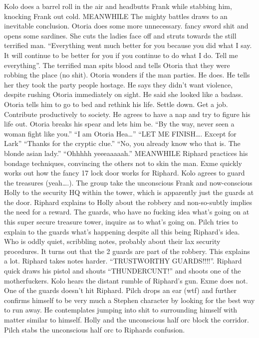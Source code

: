 Kolo does a barrel roll in the air and headbutts Frank while stabbing him, knocking Frank out cold.\medskip
MEANWHILE\medskip
The mighty battles draws to an inevitable conclusion. Otoria does some more unnecessary. fancy sword shit and opens some sardines. She cuts the ladies face off and struts towards the still terrified man.\medskip
“Everything went much better for you because you did what I say. It will continue to be better for you if you continue to do what I do. Tell me everything”.\medskip
The terrified man spits blood and tells Otoria that they were robbing the place (no shit).\medskip
Otoria wonders if the man parties. He does. He tells her they took the party people hostage. He says they didn’t want violence, despite rushing Otoria immediately on sight. He said she looked like a badass. Otoria tells him to go to bed and rethink his life. Settle down. Get a job. Contribute productively to society. He agrees to have a nap and try to figure his life out. Otoria breaks his spear and lets him be.\medskip
“By the way, never seen a woman fight like you.”\medskip
“I am Otoria Hea…”\medskip
“LET ME FINISH…. Except for Lark”\medskip
“Thanks for the cryptic clue.”\medskip
“No, you already know who that is. The blonde asian lady.”\medskip
“Ohhhhh yeeeaaaaah.”\medskip
MEANWHILE\medskip
Riphard practices his bondage techniques, convincing the others not to skin the man.\medskip
Exme quickly works out how the fancy 17 lock door works for Riphard.\medskip
Kolo agrees to guard the treasures (yeah….).\medskip
The group take the unconscious Frank and now-conscious Holly to the security HQ within the tower, which is apparently just the guards at the door.\medskip
Riphard explains to Holly about the robbery and non-so-subtly implies the need for a reward.\medskip
The guards, who have no fucking idea what’s going on at this super secure treasure tower, inquire as to what’s going on. Pilch tries to explain to the guards what’s happening despite all this being Riphard’s idea. Who is oddly quiet, scribbling notes, probably about their lax security procedures.\medskip
It turns out that the 2 guards are part of the robbery. This explains a lot. Riphard takes notes harder. “TRUSTWORTHY GUARDS!!!!”.\medskip
Riphard quick draws his pistol and shouts “THUNDERCUNT!” and shoots one of the motherfuckers.\medskip
Kolo hears the distant rumble of Riphard’s gun. Exme does not.\medskip
One of the guards doesn’t hit Riphard.\medskip
Pilch drops an ear (wtf) and further confirms himself to be very much a Stephen character by looking for the best way to run away. He contemplates jumping into shit to surrounding himself with matter similar to himself. Holly and the unconscious half orc block the corridor. Pilch stabs the unconscious half orc to Riphards confusion.\medskip
